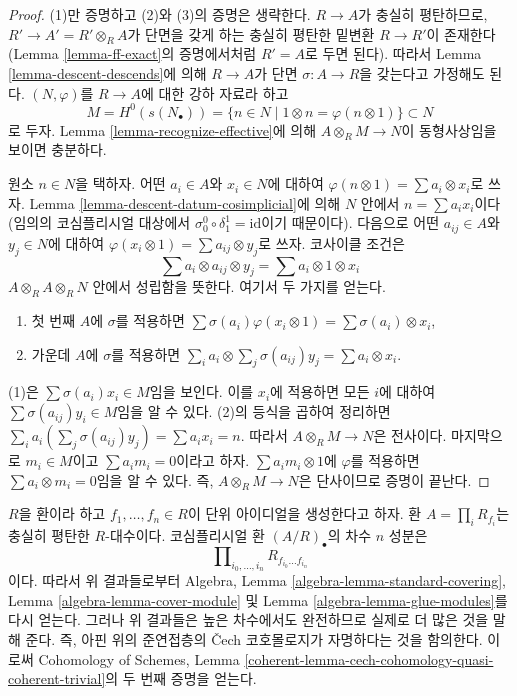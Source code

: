 \begin{proof}
(1)만 증명하고 (2)와 (3)의 증명은 생략한다. $R \to A$가 충실히 평탄하므로,
$R' \to A' = R' \otimes_R A$가 단면을 갖게 하는 충실히 평탄한 밑변환
$R \to R'$이 존재한다(Lemma \ref{lemma-ff-exact}의 증명에서처럼
$R' = A$로 두면 된다). 따라서 Lemma \ref{lemma-descent-descends}에 의해
$R \to A$가 단면 $\sigma : A \to R$을 갖는다고 가정해도 된다.
$(N, \varphi)$를 $R \to A$에 대한 강하 자료라 하고
$$
M = H^0(s(N_\bullet)) = \{n \in N \mid 1 \otimes n = \varphi(n \otimes 1)\}
\subset
N
$$
로 두자. Lemma \ref{lemma-recognize-effective}에 의해
$A \otimes_R M \to N$이 동형사상임을 보이면 충분하다.

\medskip\noindent
원소 $n \in N$을 택하자. 어떤 $a_i \in A$와 $x_i \in N$에 대하여
$\varphi(n \otimes 1) = \sum a_i \otimes x_i$로 쓰자. Lemma
\ref{lemma-descent-datum-cosimplicial}에 의해 $N$ 안에서
$n = \sum a_i x_i$이다(임의의 코심플리시얼 대상에서
$\sigma^0_0 \circ \delta^1_1 = \text{id}$이기 때문이다). 다음으로 어떤
$a_{ij} \in A$와 $y_j \in N$에 대하여
$\varphi(x_i \otimes 1) = \sum a_{ij} \otimes y_j$로 쓰자.
코사이클 조건은
$$
\sum a_i \otimes a_{ij} \otimes y_j = \sum a_i \otimes 1 \otimes x_i
$$
$A \otimes_R A \otimes_R N$ 안에서 성립함을 뜻한다. 여기서 두 가지를 얻는다.
\begin{enumerate}
\item 첫 번째 $A$에 $\sigma$를 적용하면
$\sum \sigma(a_i) \varphi(x_i \otimes 1) = \sum \sigma(a_i) \otimes x_i$,
\item 가운데 $A$에 $\sigma$를 적용하면
$\sum_i a_i \otimes \sum_j \sigma(a_{ij}) y_j = \sum a_i \otimes x_i$.
\end{enumerate}
(1)은 $\sum \sigma(a_i) x_i \in M$임을 보인다. 이를 $x_i$에 적용하면
모든 $i$에 대하여 $\sum \sigma(a_{ij})y_i \in M$임을 알 수 있다.
(2)의 등식을 곱하여 정리하면
$\sum_i a_i (\sum_j \sigma(a_{ij}) y_j) = \sum a_i x_i = n$.
따라서 $A \otimes_R M \to N$은 전사이다. 마지막으로 $m_i \in M$이고
$\sum a_i m_i = 0$이라고 하자. $\sum a_im_i \otimes 1$에 $\varphi$를
적용하면 $\sum a_i \otimes m_i = 0$임을 알 수 있다. 즉,
$A \otimes_R M \to N$은 단사이므로 증명이 끝난다.
\end{proof}

\begin{remark}
\label{remark-standard-covering}
$R$을 환이라 하고 $f_1, \ldots, f_n\in R$이 단위 아이디얼을 생성한다고
하자. 환 $A = \prod_i R_{f_i}$는 충실히 평탄한 $R$-대수이다. 코심플리시얼 환
$(A/R)_\bullet$의 차수 $n$ 성분은
$$
\prod\nolimits_{i_0, \ldots, i_n} R_{f_{i_0}\ldots f_{i_n}}
$$
이다. 따라서 위 결과들로부터 Algebra, Lemma
\ref{algebra-lemma-standard-covering}, Lemma
\ref{algebra-lemma-cover-module} 및 Lemma
\ref{algebra-lemma-glue-modules}를 다시 얻는다. 그러나 위 결과들은 높은
차수에서도 완전하므로 실제로 더 많은 것을 말해 준다. 즉, 아핀 위의
준연접층의 {\v C}ech 코호몰로지가 자명하다는 것을 함의한다. 이로써
Cohomology of Schemes, Lemma
\ref{coherent-lemma-cech-cohomology-quasi-coherent-trivial}의 두 번째 증명을
얻는다.
\end{remark}

